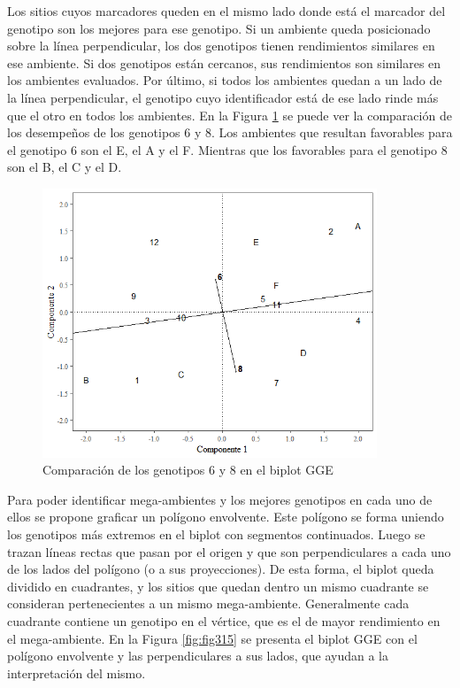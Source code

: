 Los sitios cuyos marcadores queden en el mismo lado donde está el marcador del genotipo son los mejores para ese genotipo. Si un ambiente queda posicionado sobre la línea perpendicular, los dos genotipos tienen rendimientos similares en ese ambiente. Si dos genotipos están cercanos, sus rendimientos son similares en los ambientes evaluados. Por último, si todos los ambientes quedan a un lado de la línea perpendicular, el genotipo cuyo identificador está de ese lado rinde más que el otro en todos los ambientes.
En la Figura  \ref{fig:fig314} se puede ver la comparación de los desempeños de los genotipos 6 y 8. Los ambientes que resultan favorables para el genotipo 6 son el E, el A y el F. Mientras que los favorables para el genotipo 8 son el B, el C y el D.

\begin{figure}[h]
	\begin{center}
		\includegraphics[width=10cm]{./Graficos/comp_gen_GGE.png}
	\end{center}
	\caption{Comparación de los genotipos 6 y 8 en el biplot GGE}
	\label{fig:fig314}
\end{figure}


Para poder identificar mega-ambientes y los mejores genotipos en cada uno de ellos se propone graficar un polígono envolvente. Este polígono se forma uniendo los genotipos más extremos en el biplot con segmentos continuados. Luego se trazan líneas rectas que pasan por el origen y que son perpendiculares a cada uno de los lados del polígono (o a sus proyecciones). De esta forma, el biplot queda dividido en cuadrantes, y los sitios que quedan dentro un mismo cuadrante se consideran pertenecientes a un mismo mega-ambiente. Generalmente cada cuadrante contiene un genotipo en el vértice, que es el de mayor rendimiento en el mega-ambiente.
En la Figura \ref{fig:fig315} se presenta el biplot GGE con el polígono envolvente y las perpendiculares a sus lados, que ayudan a la interpretación del mismo.

